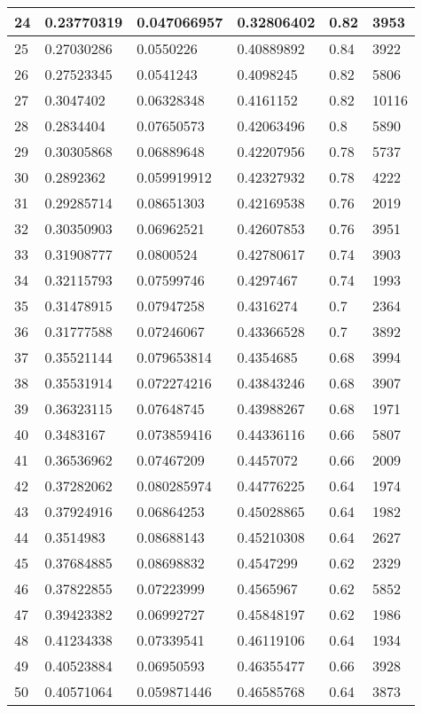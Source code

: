 \begin{longtable}{|l|l|l|l|l|l|}
24 & 0.23770319 & 0.047066957 & 0.32806402 & 0.82 & 3953 \\ \hline 
25 & 0.27030286 & 0.0550226 & 0.40889892 & 0.84 & 3922 \\ \hline 
26 & 0.27523345 & 0.0541243 & 0.4098245 & 0.82 & 5806 \\ \hline 
27 & 0.3047402 & 0.06328348 & 0.4161152 & 0.82 & 10116 \\ \hline 
28 & 0.2834404 & 0.07650573 & 0.42063496 & 0.8 & 5890 \\ \hline 
29 & 0.30305868 & 0.06889648 & 0.42207956 & 0.78 & 5737 \\ \hline 
30 & 0.2892362 & 0.059919912 & 0.42327932 & 0.78 & 4222 \\ \hline 
31 & 0.29285714 & 0.08651303 & 0.42169538 & 0.76 & 2019 \\ \hline 
32 & 0.30350903 & 0.06962521 & 0.42607853 & 0.76 & 3951 \\ \hline 
33 & 0.31908777 & 0.0800524 & 0.42780617 & 0.74 & 3903 \\ \hline 
34 & 0.32115793 & 0.07599746 & 0.4297467 & 0.74 & 1993 \\ \hline 
35 & 0.31478915 & 0.07947258 & 0.4316274 & 0.7 & 2364 \\ \hline 
36 & 0.31777588 & 0.07246067 & 0.43366528 & 0.7 & 3892 \\ \hline 
37 & 0.35521144 & 0.079653814 & 0.4354685 & 0.68 & 3994 \\ \hline 
38 & 0.35531914 & 0.072274216 & 0.43843246 & 0.68 & 3907 \\ \hline 
39 & 0.36323115 & 0.07648745 & 0.43988267 & 0.68 & 1971 \\ \hline 
40 & 0.3483167 & 0.073859416 & 0.44336116 & 0.66 & 5807 \\ \hline 
41 & 0.36536962 & 0.07467209 & 0.4457072 & 0.66 & 2009 \\ \hline 
42 & 0.37282062 & 0.080285974 & 0.44776225 & 0.64 & 1974 \\ \hline 
43 & 0.37924916 & 0.06864253 & 0.45028865 & 0.64 & 1982 \\ \hline 
44 & 0.3514983 & 0.08688143 & 0.45210308 & 0.64 & 2627 \\ \hline 
45 & 0.37684885 & 0.08698832 & 0.4547299 & 0.62 & 2329 \\ \hline 
46 & 0.37822855 & 0.07223999 & 0.4565967 & 0.62 & 5852 \\ \hline 
47 & 0.39423382 & 0.06992727 & 0.45848197 & 0.62 & 1986 \\ \hline 
48 & 0.41234338 & 0.07339541 & 0.46119106 & 0.64 & 1934 \\ \hline 
49 & 0.40523884 & 0.06950593 & 0.46355477 & 0.66 & 3928 \\ \hline 
50 & 0.40571064 & 0.059871446 & 0.46585768 & 0.64 & 3873 \\ \hline 
\end{longtable}